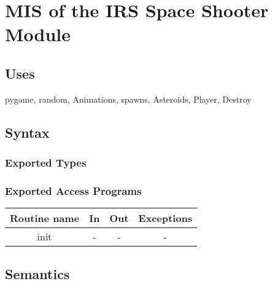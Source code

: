 \documentclass[12pt, titlepage]{article}
\begin{document}
\section {MIS of the IRS Space Shooter Module}

\subsection {Uses}
pygame, random, Animations, spawns, Asteroids, Player, Destroy

\subsection {Syntax}

\subsubsection {Exported Types}

\subsubsection {Exported Access Programs}

\begin{tabular}{| c | c | c | c |}
	\hline
	\textbf{Routine name} & \textbf{In} & \textbf{Out} & \textbf{Exceptions}\\
	\hline
	init & - & - & -  \\
	\hline
\end{tabular}

\subsection {Semantics}
\end{document}
